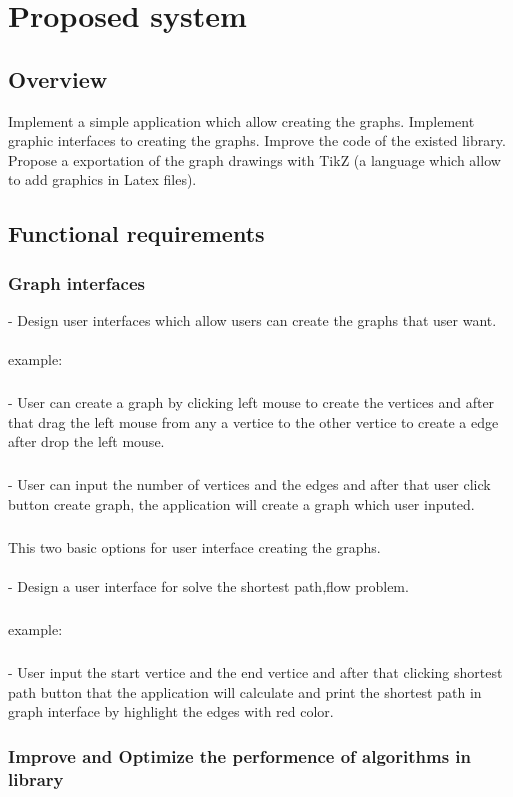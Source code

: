 \documentclass[a4paper,10pt]{article}
\begin{document}
\section{Proposed system}
\subsection{Overview}
Implement a simple application which allow creating the graphs.
Implement graphic interfaces to creating the graphs.
Improve the code of the existed library.
Propose a exportation of the graph drawings with TikZ (a language which allow to add graphics in Latex files).
\subsection{Functional requirements}
\subsubsection{Graph interfaces}
 - Design user interfaces which allow users can create the graphs that user want.
 \paragraph{} example:
 \subparagraph{} - User can create a graph by clicking left mouse to create the vertices and after that drag the left mouse from any a vertice to the other vertice to create a edge after drop the left mouse.
 \subparagraph{}  - User can input the number of vertices and the edges and after that user click button create graph, the application will create a graph which user inputed.
 \subparagraph{}  This two basic options for user interface creating the graphs.

\paragraph{}- Design a user interface for solve the shortest path,flow problem.

 \subparagraph{}example: 
 \subparagraph{} - User input the start vertice and the end vertice and after that clicking shortest path button that the application will calculate and print the shortest path in graph interface by highlight the edges with red color.

\subsubsection{Improve and Optimize the performence of algorithms in library}
\end{document}
